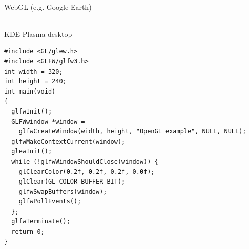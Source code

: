 \documentclass[calcdimensions,landscape,letterpaper]{powersem}
\newcommand{\thecurrentheading}{}
\newcommand{\heading}[1]{\renewcommand{\thecurrentheading}{#1}}
\begin{document}
\begin{slide}
\begin{center}
\begin{minipage}[c]{.47\textwidth}
\begin{center}
        \\
        WebGL (e.g. Google Earth)
      \end{center}
    \end{minipage}
    \begin{minipage}[c]{.47\textwidth}
      \begin{center}
        \\
        KDE Plasma desktop
      \end{center}
    \end{minipage}
  \end{center}
\end{slide}

\begin{slide}
    \heading{GLFW Window}
    \begin{center}
        \begin{minipage}[c]{.98\textwidth}
            \begin{verbatim}
#include <GL/glew.h>
#include <GLFW/glfw3.h>
int width = 320;
int height = 240;
int main(void)
{
  glfwInit();
  GLFWwindow *window =
    glfwCreateWindow(width, height, "OpenGL example", NULL, NULL);
  glfwMakeContextCurrent(window);
  glewInit();
  while (!glfwWindowShouldClose(window)) {
    glClearColor(0.2f, 0.2f, 0.2f, 0.0f);
    glClear(GL_COLOR_BUFFER_BIT);
    glfwSwapBuffers(window);
    glfwPollEvents();
  };
  glfwTerminate();
  return 0;
}
            \end{verbatim}
        \end{minipage}
    \end{center}
\end{slide}
\end{document}
